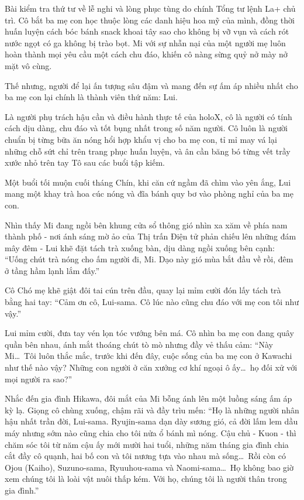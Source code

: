 \documentclass[../main.tex]{subfiles}
\begin{document}
Bài kiểm tra thứ tư về lễ nghi và lòng phục tùng do chính Tổng tư lệnh La+ chủ trì. Cô bắt ba mẹ con học thuộc lòng các danh hiệu hoa mỹ của mình, đồng thời huấn luyện cách bóc bánh snack khoai tây sao cho không bị vỡ vụn và cách rót nước ngọt có ga không bị trào bọt. Mi với sự nhẫn nại của một người mẹ luôn hoàn thành mọi yêu cầu một cách chu đáo, khiến cô nàng sừng quỷ nở mày nở mặt vô cùng.

Thế nhưng, người để lại ấn tượng sâu đậm và mang đến sự ấm áp nhiều nhất cho ba mẹ con lại chính là thành viên thứ năm: Lui.

Là người phụ trách hậu cần và điều hành thực tế của holoX, cô là người có tính cách dịu dàng, chu đáo và tốt bụng nhất trong số năm người. Cô luôn là người chuẩn bị từng bữa ăn nóng hổi hợp khẩu vị cho ba mẹ con, tỉ mỉ may vá lại những chỗ sứt chỉ trên trang phục huấn luyện, và ân cần băng bó từng vết trầy xước nhỏ trên tay Tô sau các buổi tập kiếm.

Một buổi tối muộn cuối tháng Chín, khi căn cứ ngầm đã chìm vào yên ắng, Lui mang một khay trà hoa cúc nóng và đĩa bánh quy bơ vào phòng nghỉ của ba mẹ con.

Nhìn thấy Mi đang ngồi bên khung cửa sổ thông gió nhìn xa xăm về phía nam thành phố - nơi ánh sáng mờ ảo của Thị trấn Điện tử phản chiếu lên những đám mây đêm - Lui khẽ đặt tách trà xuống bàn, dịu dàng ngồi xuống bên cạnh: ``Uống chút trà nóng cho ấm người đi, Mi. Dạo này gió mùa bắt đầu về rồi, đêm ở tầng hầm lạnh lắm đấy.''

Cô Chó mẹ khẽ giật đôi tai cún trên đầu, quay lại mỉm cười đón lấy tách trà bằng hai tay: ``Cảm ơn cô, Lui-sama. Cô lúc nào cũng chu đáo với mẹ con tôi như vậy.''

Lui mỉm cười, đưa tay vén lọn tóc vướng bên má. Cô nhìn ba mẹ con đang quây quần bên nhau, ánh mắt thoáng chút tò mò nhưng đầy vẻ thấu cảm: ``Này Mi\dots\ Tôi luôn thắc mắc, trước khi đến đây, cuộc sống của ba mẹ con ở Kawachi như thế nào vậy? Những con người ở căn xưởng cơ khí ngoại ô ấy\dots\ họ đối xử với mọi người ra sao?''

Nhắc đến gia đình Hikawa, đôi mắt của Mi bỗng ánh lên một luồng sáng ấm áp kỳ lạ. Giọng cô chùng xuống, chậm rãi và đầy trìu mến: ``Họ là những người nhân hậu nhất trần đời, Lui-sama. Ryujin-sama dạn dày sương gió, cả đời lấm lem dầu máy nhưng sớm nào cũng chia cho tôi nửa ổ bánh mì nóng. Cậu chủ - Kuon - thì chăm sóc tôi từ năm cậu ấy mới mười hai tuổi, những năm tháng gia đình chia cắt đầy cô quạnh, hai bố con và tôi nương tựa vào nhau mà sống\dots\ Rồi còn có Ojou (Kaiho), Suzuno-sama, Ryuuhou-sama và Naomi-sama\dots\ Họ không bao giờ xem chúng tôi là loài vật nuôi thấp kém. Với họ, chúng tôi là người thân trong gia đình.''
\end{document}
